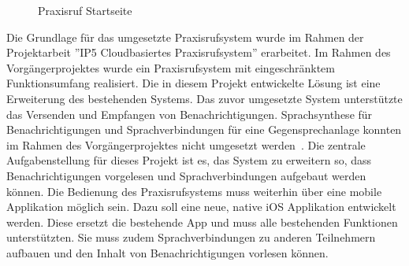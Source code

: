 \begin{figure}[h]
    \centering
    \begin{minipage}[b]{0.9\textwidth}
        \caption{Praxisruf Startseite}
    \end{minipage}
    \label{fig:AdminUI-Introduction}
\end{figure}

Die Grundlage für das umgesetzte Praxisrufsystem wurde im Rahmen der Projektarbeit ''IP5 Cloudbasiertes Praxisrufsystem'' erarbeitet.
Im Rahmen des Vorgängerprojektes wurde ein Praxisrufsystem mit eingeschränktem Funktionsumfang realisiert.
Die in diesem Projekt entwickelte Lösung ist eine Erweiterung des bestehenden Systems.
Das zuvor umgesetzte System unterstützte das Versenden und Empfangen von Benachrichtigungen.
Sprachsynthese für Benachrichtigungen und Sprachverbindungen für eine Gegensprechanlage konnten im Rahmen des Vorgängerprojektes nicht umgesetzt werden~\cite{ip5}.
Die zentrale Aufgabenstellung für dieses Projekt ist es, das System zu erweitern so, dass Benachrichtigungen vorgelesen und Sprachverbindungen aufgebaut werden können.
Die Bedienung des Praxisrufsystems muss weiterhin über eine mobile Applikation möglich sein.
Dazu soll eine neue, native iOS Applikation entwickelt werden.
Diese ersetzt die bestehende App und muss alle bestehenden Funktionen unterstützten.
Sie muss zudem Sprachverbindungen zu anderen Teilnehmern aufbauen und den Inhalt von Benachrichtigungen vorlesen können.

